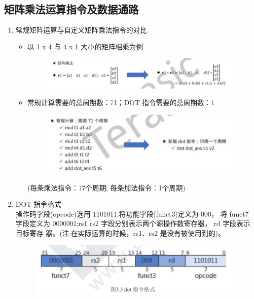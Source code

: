 \documentclass[a4paper, 14pt, oneside]{book} %
\numberwithin{equation}{subsection}
\begin{document}
		\subsection{矩阵乘法运算指令及数据通路}
		\begin{enumerate}
			\item 常规矩阵运算与自定义矩阵乘法指令的对比
				\begin{itemize}
					\item{以 1 x 4 与 4 x 1 大小的矩阵相乘为例}
						\begin{figure}[H]
							\centering
							\includegraphics[scale=0.5]{img/dot1.png}
						\end{figure}
					\item{常规计算需要的总周期数：71；DOT 指令需要的总周期数：1\\}
						\begin{figure}[H]
							\centering
							\includegraphics[scale=0.5]{img/dot2.png}
						\end{figure}
						(每条乘法指令：17个周期; 每条加法指令：1个周期)
				\end{itemize}

			\item DOT 指令格式\\
			操作码字段(opcode)选用 1101011;将功能字段(funct3)定义为 000，
			将 funct7 字段定义为 0000001;rs1 rs2 字段分别表示两个源操作数寄存器，
			rd 字段表示目标寄存 器。(注:在实际运算的时候，rs1、rs2 是没有被使用到的)。
				\begin{figure}[H]
					\centering
					\includegraphics[scale=0.5]{img/dot3.png}
				\end{figure}
			

\end{enumerate}
\end{document}
